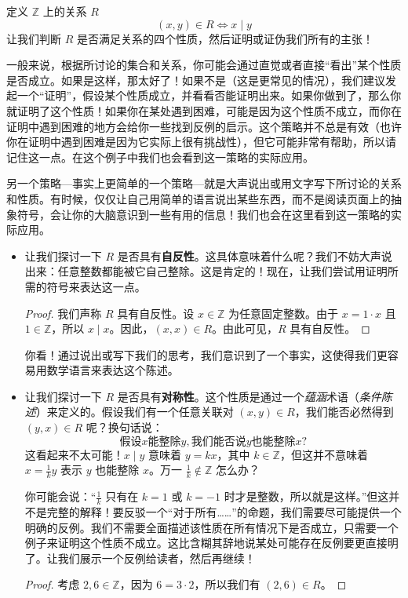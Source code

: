 \begin{example}\label{ex:example6.2.16}
    定义 $\mathbb{Z}$ 上的关系 $R$
    \[(x, y) \in R \iff x \mid y\]
    让我们判断 $R$ 是否满足关系的四个性质，然后证明或证伪我们所有的主张！

    一般来说，根据所讨论的集合和关系，你可能会通过直觉或者直接``看出''某个性质是否成立。如果是这样，那太好了！如果不是（这是更常见的情况），我们建议发起一个``证明''，假设某个性质成立，并看看否能证明出来。如果你做到了，那么你就证明了这个性质！如果你在某处遇到困难，可能是因为这个性质不成立，而你在证明中遇到困难的地方会给你一些找到反例的启示。这个策略并不总是有效（也许你在证明中遇到困难是因为它实际上很有挑战性），但它可能非常有帮助，所以请记住这一点。在这个例子中我们也会看到这一策略的实际应用。

    另一个策略---事实上更简单的一个策略---就是大声说出或用文字写下所讨论的关系和性质。有时候，仅仅让自己用简单的语言说出某些东西，而不是阅读页面上的抽象符号，会让你的大脑意识到一些有用的信息！我们也会在这里看到这一策略的实际应用。

    \begin{itemize}
        \item 让我们探讨一下 $R$ 是否具有\textbf{自反性}。这具体意味着什么呢？我们不妨大声说出来：任意整数都能被它自己整除。这是肯定的！现在，让我们尝试用证明所需的符号来表达这一点。
        \begin{proof}
            我们声称 $R$ 具有自反性。设 $x \in \mathbb{Z}$ 为任意固定整数。由于 $x = 1 \cdot x$ 且 $1 \in \mathbb{Z}$，所以 $x \mid x$。因此，$(x, x) \in R$。由此可见，$R$ 具有自反性。
        \end{proof}
        你看！通过说出或写下我们的思考，我们意识到了一个事实，这使得我们更容易用数学语言来表达这个陈述。
        \item 让我们探讨一下 $R$ 是否具有\textbf{对称性}。这个性质是通过一个\emph{蕴涵}术语（\emph{条件陈述}）来定义的。假设我们有一个任意关联对 $(x, y) \in R$，我们能否必然得到 $(y, x) \in R$ 呢？换句话说：
        \[\text{假设} x \text{能整除} y, \text{我们能否说} y \text{也能整除} x \text{?} \]
        这看起来不太可能！$x \mid y$ 意味着 $y = kx$，其中 $k \in \mathbb{Z}$，但这并不意味着 $x = \frac{1}{k}y$ 表示 $y$ 也能整除 $x$。万一 $\frac{1}{k} \notin \mathbb{Z}$ 怎么办？

        你可能会说：``$\frac{1}{k}$ 只有在 $k = 1$ 或 $k = -1$ 时才是整数，所以就是这样。''但这并不是完整的解释！要反驳一个``对于所有……''的命题，我们需要尽可能提供一个明确的反例。我们不需要全面描述该性质在所有情况下是否成立，只需要一个例子来证明这个性质不成立。这比含糊其辞地说某处可能存在反例要更直接明了。让我们展示一个反例给读者，然后再继续！
        \begin{proof}
            考虑 $2,6 \in \mathbb{Z}$，因为 $6=3 \cdot 2$，所以我们有 $(2,6) \in R$。


\end{proof}
\end{itemize}
\end{example}
